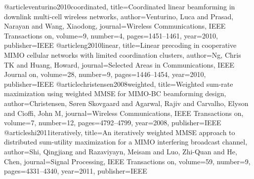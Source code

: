 \begin{thebibliography}{9}
	@article{venturino2010coordinated,
		title={Coordinated linear beamforming in downlink multi-cell wireless networks},
		author={Venturino, Luca and Prasad, Narayan and Wang, Xiaodong},
		journal={Wireless Communications, IEEE Transactions on},
		volume={9},
		number={4},
		pages={1451--1461},
		year={2010},
		publisher={IEEE}
	}
	@article{ng2010linear,
		title={Linear precoding in cooperative MIMO cellular networks with limited coordination clusters},
		author={Ng, Chris TK and Huang, Howard},
		journal={Selected Areas in Communications, IEEE Journal on},
		volume={28},
		number={9},
		pages={1446--1454},
		year={2010},
		publisher={IEEE}
	}
	@article{christensen2008weighted,
		title={Weighted sum-rate maximization using weighted MMSE for MIMO-BC beamforming design},
		author={Christensen, S{\o}ren Skovgaard and Agarwal, Rajiv and Carvalho, Elyson and Cioffi, John M},
		journal={Wireless Communications, IEEE Transactions on},
		volume={7},
		number={12},
		pages={4792--4799},
		year={2008},
		publisher={IEEE}
	}
	@article{shi2011iteratively,
		title={An iteratively weighted MMSE approach to distributed sum-utility maximization for a MIMO interfering broadcast channel},
		author={Shi, Qingjiang and Razaviyayn, Meisam and Luo, Zhi-Quan and He, Chen},
		journal={Signal Processing, IEEE Transactions on},
		volume={59},
		number={9},
		pages={4331--4340},
		year={2011},
		publisher={IEEE}
	}
\end{thebibliography}